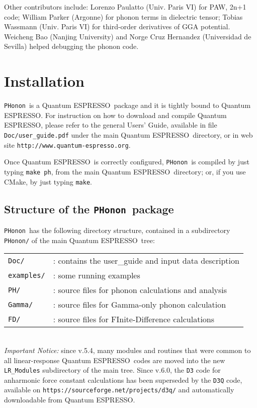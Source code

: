 \documentclass[12pt,a4paper]{article}
\def\qe{{\sc Quantum ESPRESSO}}
\def\PHonon{\texttt{PHonon}}
\begin{document}
Other contributors include: Lorenzo Paulatto (Univ. Paris VI) for
PAW, 2n+1 code; William Parker (Argonne) for phonon terms in dielectric
tensor; Tobias Wassmann (Univ. Paris VI) for third-order derivatives of GGA 
potential. Weicheng Bao (Nanjing University) and Norge Cruz Hernandez
(Universidad de Sevilla) helped debugging the phonon code.



\section{Installation}

\PHonon\ is a \qe\ package and it is tightly bound to \qe.
For instruction on how to download and compile \qe, please refer
to the general Users' Guide, available in file \texttt{Doc/user\_guide.pdf}
under the main \qe\ directory, or in web site
\texttt{http://www.quantum-espresso.org}.

Once \qe\ is correctly configured, \PHonon\ is compiled by
just typing \texttt{make ph}, from the main \qe\ directory;
or, if you use CMake, by just typing \texttt{make}.

\subsection{Structure of the \PHonon\ package}

\PHonon\ has the following directory structure,
contained in a subdirectory \texttt{PHonon/}
of the main \qe\ tree:

\begin{tabular}{ll}
\texttt{Doc/} & : contains the user\_guide and input data description \\
\texttt{examples/} & : some running examples \\
\texttt{PH/}      & : source files for phonon calculations 
                   and analysis\\
\texttt{Gamma/}   & : source files for Gamma-only phonon calculation\\
\texttt{FD/}      & : source files for FInite-Difference calculations\\
\end{tabular}\\
{\em Important Notice:} since v.5.4, many modules and routines that were
common to all linear-response \qe\ codes are moved into the new 
\texttt{LR\_Modules} subdirectory of the main tree. Since v.6.0, the
\texttt{D3} code for anharmonic force constant calculations has been 
superseded by the \texttt{D3Q} code, available on
\texttt{https://sourceforge.net/projects/d3q/} and automatically
downloadable from \qe.
\end{document}
